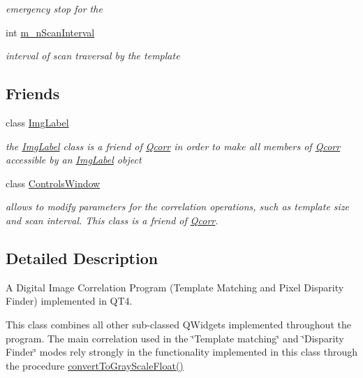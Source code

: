 \begin{CompactItemize}
\begin{CompactList}\small\item\em emergency stop for the \item\end{CompactList}\item 
\hypertarget{classQcorr_b07379fbbd7be906023eb5ec4d555931}{
int \hyperlink{classQcorr_b07379fbbd7be906023eb5ec4d555931}{m\_\-nScanInterval}}
\label{classQcorr_b07379fbbd7be906023eb5ec4d555931}

\begin{CompactList}\small\item\em interval of scan traversal by the template \item\end{CompactList}\end{CompactItemize}
\subsection*{Friends}
\begin{CompactItemize}
\item 
class \hyperlink{classQcorr_5b4b2caf4c596b601dd096785e4a32b9}{ImgLabel}
\begin{CompactList}\small\item\em the \hyperlink{classImgLabel}{ImgLabel} class is a friend of \hyperlink{classQcorr}{Qcorr} in order to make all members of \hyperlink{classQcorr}{Qcorr} accessible by an \hyperlink{classImgLabel}{ImgLabel} object \item\end{CompactList}\item 
class \hyperlink{classQcorr_ce49e9a34b2d2df1e7683be4cacba1d8}{ControlsWindow}
\begin{CompactList}\small\item\em allows to modify parameters for the correlation operations, such as template size and scan interval. This class is a friend of \hyperlink{classQcorr}{Qcorr}. \item\end{CompactList}\end{CompactItemize}


\subsection{Detailed Description}
A Digital Image Correlation Program (Template Matching and Pixel Disparity Finder) implemented in QT4. 

This class combines all other sub-classed QWidgets implemented throughout the program. The main correlation used in the \char`\"{}Template matching\char`\"{} and \char`\"{}Disparity Finder\char`\"{} modes rely strongly in the functionality implemented in this class through the procedure \hyperlink{classQcorr_d1b26ace597c0c4a0f64a0bd9576d4fc}{convertToGrayScaleFloat()}

